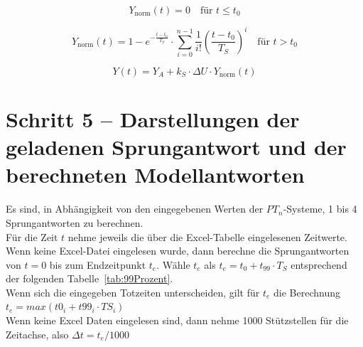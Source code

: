 \documentclass[main.tex]{subfiles}
\begin{document}
\begin{equation}
    Y_{\text{norm}}(t) = 0 \quad \text{für } t \le t_0
\end{equation}

\begin{equation}
    Y_{\text{norm}}(t) = 1 - e^{-\frac{t - t_0}{T_S}} \cdot \sum_{i=0}^{n-1} \frac{1}{i!} \left(\frac{t - t_0}{T_S}\right)^{i}
    \quad \text{für } t > t_0
    \label{eq:Ynorm}
\end{equation}

\begin{equation}
    Y(t) = Y_A + k_S \cdot \Delta U \cdot Y_{\text{norm}}(t)
    \label{eq:YSprung}
\end{equation}

\section{Schritt 5 – Darstellungen der geladenen Sprungantwort und der berechneten Modellantworten}
\label{sec:Schritt5}  %

Es sind, in Abhängigkeit von den eingegebenen Werten der $PT_n$-Systeme, 1 bis 4 Sprungantworten zu berechnen.\\
Für die Zeit $t$ nehme jeweils die über die Excel-Tabelle eingelesenen Zeitwerte.  %
Wenn keine Excel-Datei eingelesen wurde, dann berechne die Sprungantworten von $t=0$ bis zum Endzeitpunkt $t_e$. Wähle $t_e$ als $t_e = t_0 + t_{99} \cdot T_S$ entsprechend der folgenden Tabelle~\ref{tab:99Prozent}.\\
Wenn sich die eingegeben Totzeiten unterscheiden, gilt für  $t_e$ die Berechnung 
$t_e = max(t0_i + t99_i · TS_i)$\\ %
Wenn keine Excel Daten eingelesen sind, dann nehme 1000 Stützstellen für die Zeitachse, also $\Delta t = t_e/1000$ \\ %
\end{document}
